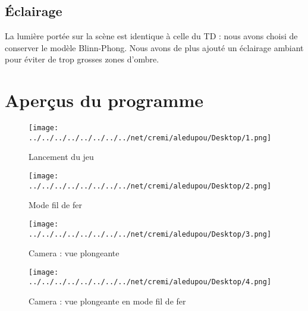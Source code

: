 \documentclass{report}
\begin{document}
\section{Éclairage}	
La lumière portée sur la scène est identique à celle du TD : nous avons choisi de conserver le modèle Blinn-Phong.
Nous avons de plus ajouté un éclairage ambiant pour éviter de trop grosses zones d'ombre.

\chapter{Aperçus du programme}

\begin{figure}[hbtp]
\caption{Lancement du jeu}
\centering
\texttt{[image: ../../../../../../../../net/cremi/aledupou/Desktop/1.png]}
\end{figure}

\begin{figure}[hbtp]
\caption{Mode fil de fer}
\centering
\texttt{[image: ../../../../../../../../net/cremi/aledupou/Desktop/2.png]}
\end{figure}

\begin{figure}[hbtp]
\caption{Camera : vue plongeante}
\centering
\texttt{[image: ../../../../../../../../net/cremi/aledupou/Desktop/3.png]}
\end{figure}

\begin{figure}[hbtp]
\caption{Camera : vue plongeante en mode fil de fer}
\centering
\texttt{[image: ../../../../../../../../net/cremi/aledupou/Desktop/4.png]}
\end{figure}
\end{document}
